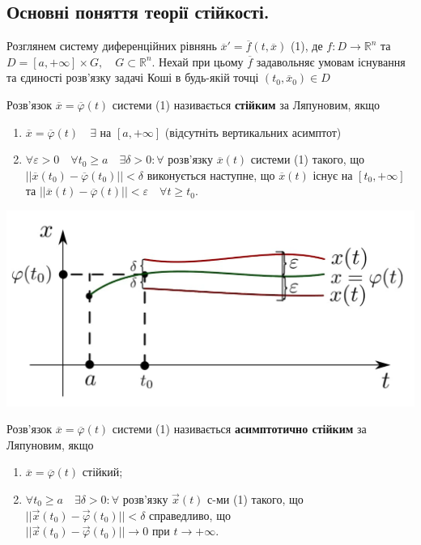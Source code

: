 \documentclass[14pt,a4paper]{scrartcl}
\theoremstyle{definition}
\theoremstyle{definition}
\theoremstyle{definition}
\begin{document}
\subsection{Основні поняття теорії стійкості.}
Розглянем систему диференційних рівнянь $\overline{x}' = \overline{f}(t, \overline{x})$ (1), де $f : D \rightarrow \mathbb{R}^n$ та $D = [a, +\infty] \times G, \quad G \subset \mathbb{R}^n$. Нехай при цьому $\overline{f}$ задавольняє умовам існування та єдиності розв'язку задачі Коші в будь-якій точці $(t_0, \overline{x}_0) \in D$

\bd
Розв'язок $\overline{x} = \overline{\varphi}(t)$ системи (1) називається \textbf{стійким} за Ляпуновим, якщо

\begin{enumerate}
  \item $\overline{x} = \overline{\varphi}(t) \quad \exists  \text{ на } [a, +\infty]$ (відсутніть вертикальних асимптот)
  \item $\forall \varepsilon > 0 \quad \forall t_0 \geq a \quad \exists \delta > 0 : \forall $ розв'язку $\overline{x}(t)$ системи (1) такого, що $||\overline{x}(t_0) - \overline{\varphi}(t_0)|| < \delta$ виконується наступне, що $\overline{x}(t)$ існує на $[t_0, +\infty]$ та $||\overline{x}(t) - \overline{\varphi}(t)|| < \varepsilon \quad \forall t \geq t_0$.
\end{enumerate}
\ed

\begin{center} \includegraphics[scale=0.35]{assets/lect1.jpg} \end{center}

\bd
Розв'язок $\overline{x} = \overline{\varphi}(t)$ системи (1) називається \textbf{асимптотично стійким} за Ляпуновим, якщо

\begin{enumerate}
  \item $\overline{x} = \overline{\varphi}(t)$ стійкий;
  \item $\forall t_0 \geq a \quad \exists \delta > 0: \forall$ розв'язку $\vec{x}(t)$ с-ми (1) такого, що $||\vec{x}(t_0) - \vec{\varphi}(t_0)|| < \delta$ справедливо, що $||\vec{x}(t_0) - \vec{\varphi}(t_0)|| \rightarrow 0 \text{ при } t \rightarrow + \infty$.
\end{enumerate}
\end{document}
